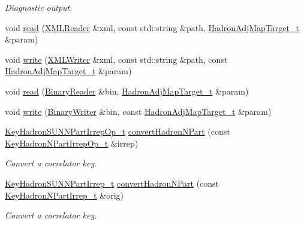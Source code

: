 \begin{DoxyCompactItemize}
\begin{DoxyCompactList}\small\item\em Diagnostic output. \end{DoxyCompactList}\item 
void \mbox{\hyperlink{namespaceHadron_a9a69bb90cd1c62da66808573864f7cd1}{read}} (\mbox{\hyperlink{classADATXML_1_1XMLReader}{X\+M\+L\+Reader}} \&xml, const std\+::string \&path, \mbox{\hyperlink{structHadron_1_1HadronAdjMapTarget__t}{Hadron\+Adj\+Map\+Target\+\_\+t}} \&param)
\item 
void \mbox{\hyperlink{namespaceHadron_add6d43a3a15c934d9c3e98989588d22e}{write}} (\mbox{\hyperlink{classADATXML_1_1XMLWriter}{X\+M\+L\+Writer}} \&xml, const std\+::string \&path, const \mbox{\hyperlink{structHadron_1_1HadronAdjMapTarget__t}{Hadron\+Adj\+Map\+Target\+\_\+t}} \&param)
\item 
void \mbox{\hyperlink{namespaceHadron_a2e69cce268ca3e4d68bc0954eb3f8065}{read}} (\mbox{\hyperlink{classADATIO_1_1BinaryReader}{Binary\+Reader}} \&bin, \mbox{\hyperlink{structHadron_1_1HadronAdjMapTarget__t}{Hadron\+Adj\+Map\+Target\+\_\+t}} \&param)
\item 
void \mbox{\hyperlink{namespaceHadron_a97d7de65e3fea244c875c2cb76decfda}{write}} (\mbox{\hyperlink{classADATIO_1_1BinaryWriter}{Binary\+Writer}} \&bin, const \mbox{\hyperlink{structHadron_1_1HadronAdjMapTarget__t}{Hadron\+Adj\+Map\+Target\+\_\+t}} \&param)
\item 
\mbox{\hyperlink{structHadron_1_1KeyHadronSUNNPartIrrepOp__t}{Key\+Hadron\+S\+U\+N\+N\+Part\+Irrep\+Op\+\_\+t}} \mbox{\hyperlink{namespaceHadron_ac6bc3e869d76d287be23c6d20cb9c104}{convert\+Hadron\+N\+Part}} (const \mbox{\hyperlink{structHadron_1_1KeyHadronNPartIrrepOp__t}{Key\+Hadron\+N\+Part\+Irrep\+Op\+\_\+t}} \&irrep)
\begin{DoxyCompactList}\small\item\em Convert a correlator key. \end{DoxyCompactList}\item 
\mbox{\hyperlink{structHadron_1_1KeyHadronSUNNPartIrrep__t}{Key\+Hadron\+S\+U\+N\+N\+Part\+Irrep\+\_\+t}} \mbox{\hyperlink{namespaceHadron_a870585feaeca280be18774aa6242e2e9}{convert\+Hadron\+N\+Part}} (const \mbox{\hyperlink{structHadron_1_1KeyHadronNPartIrrep__t}{Key\+Hadron\+N\+Part\+Irrep\+\_\+t}} \&orig)
\begin{DoxyCompactList}\small\item\em Convert a correlator key. \end{DoxyCompactList}\item 

\end{DoxyCompactItemize}
